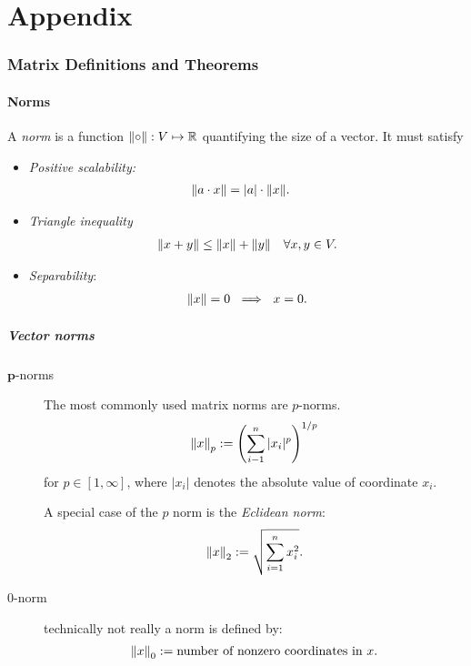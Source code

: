 \newpage
\appendix
 
\part*{Appendix}
\section{Matrix Definitions and Theorems}
\subsection{Norms}
A \emph{norm} is a function $\left\lVert\circ\right\rVert: V \mapsto \mathbb{R}$ quantifying the size of a vector. It must satisfy
\begin{itemize}
    \item \emph{Positive scalability:}
    \begin{align*}
        \norm{a\cdot x} &= |a|\cdot \norm{x}.
    \end{align*}
    \item \emph{Triangle inequality}
    \begin{align*}
        \norm{x+y} \leq \norm{x} + \norm{y} \quad \forall x,y \in V.
    \end{align*}
    \item \emph{Separability}:
    \begin{align*}
        \left\lVert x\right\rVert = 0 \ \implies \ x=0.
    \end{align*}
\end{itemize}
\subsubsection{Vector norms}
\begin{description}
    \item[$\mathbf{p}$-norms] The most commonly used matrix norms are $p$-norms.
        \begin{align*}
            \left\lVert x\right\rVert_p := \left(\sum_{i-1}^n |x_i|^p\right)^{1/p}
        \end{align*}
        for $p \in [1,\infty]$, where $|x_i|$ denotes the absolute value of coordinate $x_i$.
        
        A special case of the $p$ norm is the \emph{Eclidean norm}:
        \begin{align*}
            \left\lVert x\right\rVert_2:= \sqrt{\sum_{i=1}^n x_i^2}.
        \end{align*}
    \item[$0$-norm] technically not really a norm is defined by:
        \begin{align*}
            \left\lVert x\right\rVert_0 := \text{number of nonzero coordinates in $x$}.
        \end{align*}
\end{description}
